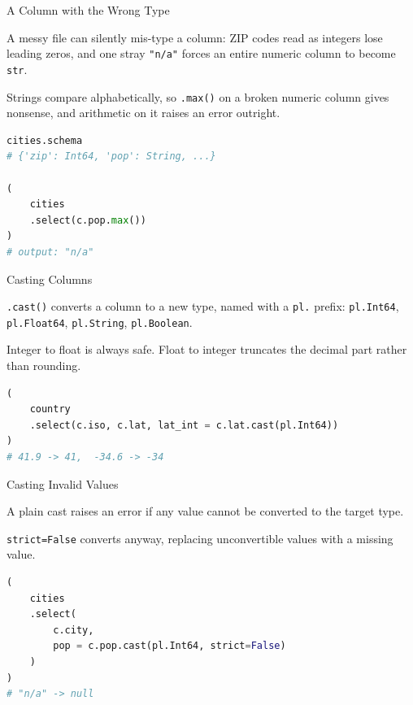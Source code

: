 \documentclass[8pt,aspectratio=169]{beamer}
\begin{document}
\begin{frame}[fragile]{A Column with the Wrong Type}
\begin{splitcode}{%

A messy file can silently mis-type a column: ZIP codes read as integers lose leading zeros, and one stray \texttt{"n/a"} forces an entire numeric column to become \texttt{str}.

Strings compare alphabetically, so \texttt{.max()} on a broken numeric column gives nonsense, and arithmetic on it raises an error outright.

}
\begin{lstlisting}[language=Python]
cities.schema
# {'zip': Int64, 'pop': String, ...}

(
    cities
    .select(c.pop.max())
)
# output: "n/a"
\end{lstlisting}
\end{splitcode}
\end{frame}

\begin{frame}[fragile]{Casting Columns}
\begin{splitcode}{%

\texttt{.cast()} converts a column to a new type, named with a \texttt{pl.} prefix: \texttt{pl.Int64}, \texttt{pl.Float64}, \texttt{pl.String}, \texttt{pl.Boolean}.

Integer to float is always safe. Float to integer truncates the decimal part rather than rounding.

}
\begin{lstlisting}[language=Python]
(
    country
    .select(c.iso, c.lat, lat_int = c.lat.cast(pl.Int64))
)
# 41.9 -> 41,  -34.6 -> -34
\end{lstlisting}
\end{splitcode}
\end{frame}

\begin{frame}[fragile]{Casting Invalid Values}
\begin{splitcode}{%

A plain cast raises an error if any value cannot be converted to the target type.

\texttt{strict=False} converts anyway, replacing unconvertible values with a missing value.

}
\begin{lstlisting}[language=Python]
(
    cities
    .select(
        c.city,
        pop = c.pop.cast(pl.Int64, strict=False)
    )
)
# "n/a" -> null
\end{lstlisting}
\end{splitcode}
\end{frame}
\end{document}
